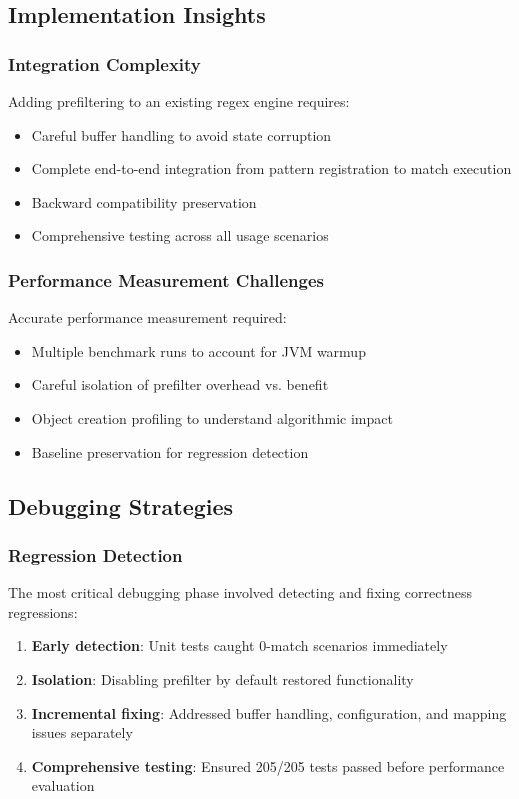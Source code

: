 \documentclass[11pt,a4paper]{article}
\begin{document}
\subsection{Implementation Insights}

\subsubsection{Integration Complexity}
Adding prefiltering to an existing regex engine requires:
\begin{itemize}
\item Careful buffer handling to avoid state corruption
\item Complete end-to-end integration from pattern registration to match execution
\item Backward compatibility preservation
\item Comprehensive testing across all usage scenarios
\end{itemize}

\subsubsection{Performance Measurement Challenges}
Accurate performance measurement required:
\begin{itemize}
\item Multiple benchmark runs to account for JVM warmup
\item Careful isolation of prefilter overhead vs. benefit
\item Object creation profiling to understand algorithmic impact
\item Baseline preservation for regression detection
\end{itemize}

\subsection{Debugging Strategies}

\subsubsection{Regression Detection}
The most critical debugging phase involved detecting and fixing correctness regressions:
\begin{enumerate}
\item \textbf{Early detection}: Unit tests caught 0-match scenarios immediately
\item \textbf{Isolation}: Disabling prefilter by default restored functionality
\item \textbf{Incremental fixing}: Addressed buffer handling, configuration, and mapping issues separately
\item \textbf{Comprehensive testing}: Ensured 205/205 tests passed before performance evaluation
\end{enumerate}
\end{document}
